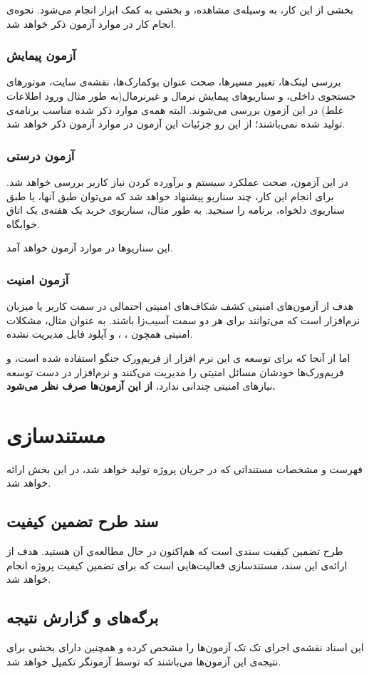 \documentclass[12pt]{article}
\begin{document}
بخشی از این کار، به وسیله‌ی مشاهده، و بخشی به کمک ابزار 
انجام می‌شود. نحوه‌ی انجام کار در موارد آزمون ذکر خواهد شد.
\subsubsection{آزمون پیمایش}
بررسی لینک‌ها، تغییر مسیرها، صحت عنوان بوکمارک‌ها، نقشه‌ی سایت، موتورهای جستجوی داخلی، و سناریوهای پیمایش نرمال و غیرنرمال(به طور مثال ورود اطلاعات غلط) در این آزمون بررسی می‌شوند. البته همه‌ی موارد ذکر شده مناسب برنامه‌ی تولید شده نمی‌باشند؛ از این رو جزئیات این آزمون در موارد آزمون ذکر خواهد شد.

\subsubsection{آزمون درستی}
در این آزمون، صحت عملکرد سیستم و برآورده کردن نیاز کاربر بررسی خواهد شد. برای انجام این کار، چند سناریو پیشنهاد خواهد شد که می‌توان طبق آنها، یا طبق سناریوی دلخواه، برنامه را سنجید. به طور مثال، سناریوی خربد یک هفته‌ی یک اتاق خوابگاه.

این سناریوها در موارد آزمون خواهد آمد.
\subsubsection{آزمون امنیت}
هدف از آزمون‌های امنیتی کشف شکاف‌های امنیتی احتمالی در سمت کاربر یا میزبان نرم‌افزار است که می‌توانند برای هر دو سمت آسیب‌زا باشند. به عنوان مثال، مشکلات امنیتی همچون ، ،  و آپلود فایل مدیریت نشده.

اما از آنجا که برای توسعه ی این نرم افزار از فریم‌ورک جنگو استفاده شده است، و فریم‌ورک‌ها خودشان مسائل امنیتی را مدیریت می‌کنند و نرم‌افزار در دست توسعه نیازهای امنیتی چندانی ندارد،
\textbf{از این آزمون‌ها صرف نظر می‌شود.}

\section{مستندسازی}
فهرست و مشخصات مستنداتی که در جریان پروژه تولید خواهد شد، در این بخش ارائه خواهد شد.
\subsection{سند طرح تضمین کیفیت}
طرح تضمین کیفیت سندی است که هم‌اکنون در حال مطالعه‌ی آن هستید. هدف از ارائه‌ی این سند، مستندسازی فعالیت‌هایی است که برای تضمین کیفیت پروژه انجام خواهد شد.

\subsection{برگه‌های  و گزارش نتیجه}
این اسناد نقشه‌ی اجرای تک تک آزمون‌ها را مشخص کرده و همچنین دارای بخشی برای نتیجه‌ی این آزمون‌ها می‌باشند که توسط آزمونگر تکمیل خواهد شد.
\end{document}
